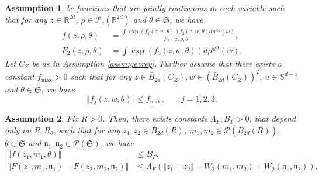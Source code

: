 \documentclass{article}
\newtheorem{assumption}{Assumption}
\newcommand{\R}{\mathbb{R}}
\begin{document}
\begin{appendices}
\begin{assumption}
 be functions that are jointly continuous in each variable such that for any $z\in \R^{2d}$, $\rho\in \mathcal P_c(\R^{2d})$ and $\theta \in \mathfrak{S}$, we have
\begin{align}\label{eqn:f}
    f(z,\rho,\theta) &= \frac{\int  \exp(f_1(z,w,\theta)) f_2(z,w,\theta) d\rho^{\otimes 2}(w)}{F_2(z,\rho,\theta)},\\
F_2(z,\rho,\theta) &= \int \exp(f_{3}(z,w,\theta))d\rho^{\otimes 2}(w).
\end{align}
Let $C_Z$ be as in Assumption \ref{assm:gevrey}. Further assume that there exists a constant $f_\mathrm{max}>0$ such that for any $z\in \bar B_{2d}(C_Z),w\in (\bar B_{2d}(C_Z))^2$, $u\in \mathbb S^{d-1}$ and $\theta \in \mathfrak{S}$, we have
    \[
    \Vert f_j(z,w,\theta)\Vert \le f_\mathrm{max}, \qquad j=1,2,3.
    \]
\end{assumption}
\begin{assumption}\label{assm:LipCont}
Fix $R>0$. Then, there exists constants $\Lambda_F,B_F>0$, that depend only on $R,R_\theta$, such that for any $z_1,z_2\in \bar B_{2d}(R)$, $m_1,m_2\in \mathcal P(\bar B_{2d}(R))$, $\theta\in \mathfrak{S}$ and $\mathfrak n_1,\mathfrak n_2\in \mathcal P(\mathfrak{S})$, we have
    \begin{align*}
    \Vert f(z_1,m_1,\theta)\Vert &\le B_F, \\
         \Vert F(z_1,m_1,\mathfrak{n}_1)- F(z_2,m_2,\mathfrak{n}_2)\Vert &\le \Lambda_F\left(\Vert z_1-z_2\Vert +  W_2(m_1,m_2)+  W_2(\mathfrak n_1,\mathfrak n_2) \right).
    \end{align*}
\end{assumption}

\end{appendices}
\end{document}
